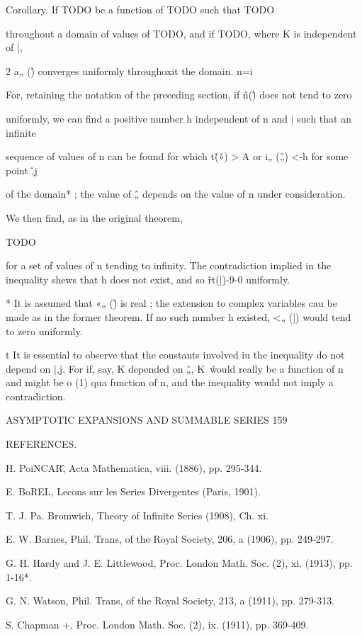 Corollary. If TODO be a function of TODO such that TODO

throughout a domain of values of TODO, and if TODO, where K is independent of |,

2 a„ (\^) converges uniformly throughoxit the domain.
n=i

For, retaining the notation of the preceding section, if \^n(\^) does not tend to zero

uniformly, we can find a positive number h independent of n and | such that an infinite

sequence of values of n can be found for which t\^ (\^») > A or i„ (\^„) <-h for some point \^,j

of the domain* ; the value of \^„ depends on the value of n under consideration.

We then find, as in the original theorem,

TODO

for a set of values of n tending to infinity. The contradiction implied in the inequality
shews that h does not exist, and so \^rt(|)-9-0 uniformly.

* It is assumed that «„ (\^) is real ; the extension to complex variables cau be made as in the
former theorem. If no such number h existed, <„ (|) would tend to zero uniformly.

t It is essential to observe that the constants involved iu the inequality do not depend on |,j.
For if, say, K depended on \^„, K~\^ would really be a function of n and might be o (1) qua function
of n, and the inequality would not imply a contradiction.



ASYMPTOTIC EXPANSIONS AND SUMMABLE SERIES 159

REFERENCES.

H. PoiNCAR\^, Acta Mathematica, viii. (1886), pp. 295-344.

E. BoREL, Lecons sur les Series Divergentes (Paris, 1901).

T. J. Pa. Bromwich, Theory of Infinite Series (1908), Ch. xi.

E. W. Barnes, Phil. Trans, of the Royal Society, 206, a (1906), pp. 249-297.

G. H. Hardy and J. E. Littlewood, Proc. London Math. Soc. (2), xi. (1913), pp. 1-16*.

G. N. Watson, Phil. Trans, of the Royal Society, 213, a (1911), pp. 279-313.

S. Chapman +, Proc. London Math. Soc. (2), ix. (1911), pp. 369-409.

